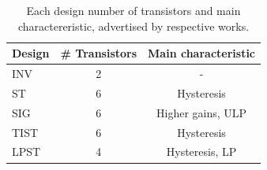 \documentclass[diss,pgmicro,english]{iiufrgs}
\begin{document}
\begin{table}[]
\centering
\caption{Each design number of transistors and main charactereristic, advertised by respective works.}
\label{tab:designHighlight}
\begin{tabular}{lcc}
\hline
Design & \# Transistors & Main characteristic \\ \hline
INV & 2 & - \\ \hline
ST & 6 & Hysteresis \\ \hline
SIG & 6 & Higher gains, ULP \\ \hline
TIST & 6 & Hysteresis \\ \hline
LPST & 4 & Hysteresis, LP \\ \hline
\end{tabular}
\end{table}



\end{document}
